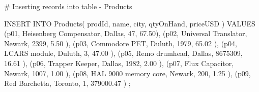 \documentclass[
  letterpaper,
  DIV=11,
  numbers=noendperiod]{scrreprt}
\newenvironment{Shaded}{\begin{snugshade}}{\end{snugshade}}
\newcommand{\CommentTok}[1]{\textcolor[rgb]{0.37,0.37,0.37}{#1}}
\newcommand{\DecValTok}[1]{\textcolor[rgb]{0.68,0.00,0.00}{#1}}
\newcommand{\FloatTok}[1]{\textcolor[rgb]{0.68,0.00,0.00}{#1}}
\newcommand{\FunctionTok}[1]{\textcolor[rgb]{0.28,0.35,0.67}{#1}}
\newcommand{\NormalTok}[1]{\textcolor[rgb]{0.00,0.23,0.31}{#1}}
\newcommand{\StringTok}[1]{\textcolor[rgb]{0.13,0.47,0.30}{#1}}
\begin{document}
\begin{Shaded}
\begin{Highlighting}[]
\CommentTok{\# Inserting records into table {-} Products }

\NormalTok{INSERT INTO }\FunctionTok{Products}\NormalTok{( prodId, name, city, qtyOnHand, priceUSD )}
\NormalTok{VALUES}
\NormalTok{(}\StringTok{\textquotesingle{}p01\textquotesingle{}}\NormalTok{, }\StringTok{\textquotesingle{}Heisenberg Compensator\textquotesingle{}}\NormalTok{, }\StringTok{\textquotesingle{}Dallas\textquotesingle{}}\NormalTok{, }\DecValTok{47}\NormalTok{,  }\FloatTok{67.50}\NormalTok{),}
\NormalTok{(}\StringTok{\textquotesingle{}p02\textquotesingle{}}\NormalTok{, }\StringTok{\textquotesingle{}Universal Translator\textquotesingle{}}\NormalTok{, }\StringTok{\textquotesingle{}Newark\textquotesingle{}}\NormalTok{, }\DecValTok{2399}\NormalTok{, }\FloatTok{5.50}\NormalTok{ ),}
\NormalTok{(}\StringTok{\textquotesingle{}p03\textquotesingle{}}\NormalTok{, }\StringTok{\textquotesingle{}Commodore PET\textquotesingle{}}\NormalTok{, }\StringTok{\textquotesingle{}Duluth\textquotesingle{}}\NormalTok{, }\DecValTok{1979}\NormalTok{, }\FloatTok{65.02}\NormalTok{ ),}
\NormalTok{(}\StringTok{\textquotesingle{}p04\textquotesingle{}}\NormalTok{, }\StringTok{\textquotesingle{}LCARS module\textquotesingle{}}\NormalTok{, }\StringTok{\textquotesingle{}Duluth\textquotesingle{}}\NormalTok{, }\DecValTok{3}\NormalTok{, }\FloatTok{47.00}\NormalTok{ ),}
\NormalTok{(}\StringTok{\textquotesingle{}p05\textquotesingle{}}\NormalTok{, }\StringTok{\textquotesingle{}Remo drumhead\textquotesingle{}}\NormalTok{, }\StringTok{\textquotesingle{}Dallas\textquotesingle{}}\NormalTok{, }\DecValTok{8675309}\NormalTok{, }\FloatTok{16.61}\NormalTok{ ),}
\NormalTok{(}\StringTok{\textquotesingle{}p06\textquotesingle{}}\NormalTok{, }\StringTok{\textquotesingle{}Trapper Keeper\textquotesingle{}}\NormalTok{, }\StringTok{\textquotesingle{}Dallas\textquotesingle{}}\NormalTok{, }\DecValTok{1982}\NormalTok{, }\FloatTok{2.00}\NormalTok{ ),}
\NormalTok{(}\StringTok{\textquotesingle{}p07\textquotesingle{}}\NormalTok{, }\StringTok{\textquotesingle{}Flux Capacitor\textquotesingle{}}\NormalTok{, }\StringTok{\textquotesingle{}Newark\textquotesingle{}}\NormalTok{, }\DecValTok{1007}\NormalTok{, }\FloatTok{1.00}\NormalTok{ ),}
\NormalTok{(}\StringTok{\textquotesingle{}p08\textquotesingle{}}\NormalTok{, }\StringTok{\textquotesingle{}HAL 9000 memory core\textquotesingle{}}\NormalTok{, }\StringTok{\textquotesingle{}Newark\textquotesingle{}}\NormalTok{, }\DecValTok{200}\NormalTok{, }\FloatTok{1.25}\NormalTok{ ),}
\NormalTok{(}\StringTok{\textquotesingle{}p09\textquotesingle{}}\NormalTok{, }\StringTok{\textquotesingle{}Red Barchetta\textquotesingle{}}\NormalTok{,  }\StringTok{\textquotesingle{}Toronto\textquotesingle{}}\NormalTok{, }\DecValTok{1}\NormalTok{, }\FloatTok{379000.47}\NormalTok{ )}
\NormalTok{;}



\end{Highlighting}
\end{Shaded}
\end{document}
